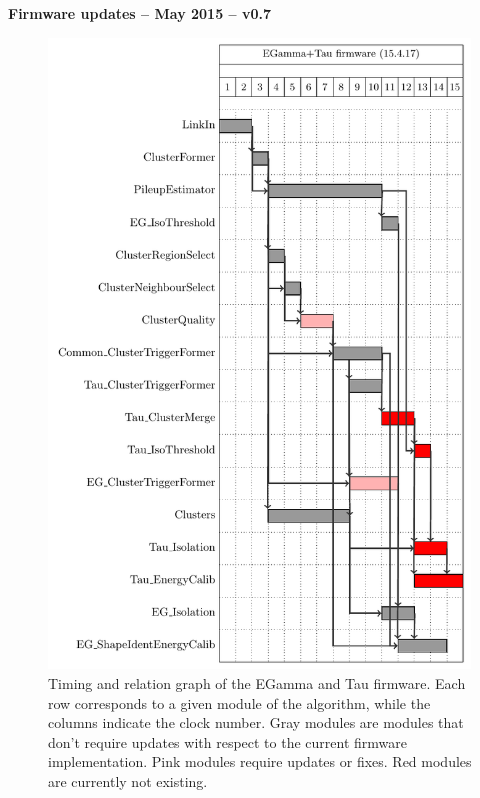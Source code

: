 \documentclass[a4paper, 12pt]{article}
\begin{document}
\renewcommand{\contentsname}{}


\begin{center}
{\LARGE \bf Firmware updates -- May 2015 -- v0.7}\\
\end{center}


\begin{figure}[hbtp]
  \begin{center}
    \includegraphics[width=11.2cm]{./gantt_charts/firmware_egAndTau_mod.pdf}
    \caption{Timing and relation graph of the EGamma and Tau firmware. Each row corresponds to a given module of the algorithm, while the columns indicate the clock number. Gray modules are modules that don't require updates with respect to the current firmware implementation. Pink modules require updates or fixes. Red modules are currently not existing.}
    \label{fig:gantt}
  \end{center}
\end{figure}
\end{document}
